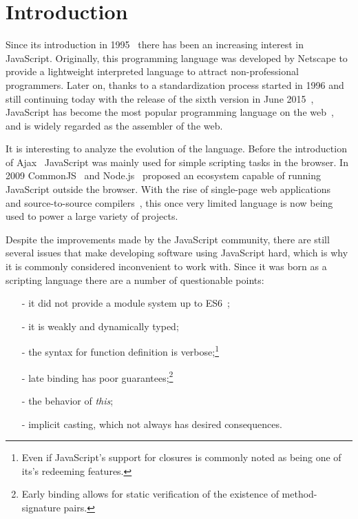 \documentclass{sig-alternate}
\begin{document}



\section{Introduction}
Since its introduction in 1995~\cite{web:js} there has been an increasing interest in JavaScript. Originally, this programming language was developed by Netscape to provide a lightweight interpreted language to attract non-professional programmers. Later on, thanks to a standardization process started in 1996 and still continuing today with the release of the sixth version in June 2015~\cite{web:ecmascript6}, JavaScript has become the most popular programming language on the web~\cite{redmonk}, and is widely regarded as the assembler of the web.

It is interesting to analyze the evolution of the language. Before the introduction of Ajax~\cite{web:ajax} JavaScript was mainly used for simple scripting tasks in the browser. In 2009 CommonJS~\cite{web:commonjs} and Node.js~\cite{web:nodejs} proposed an ecosystem capable of running JavaScript outside the browser. With the rise of single-page web applications~\cite{web:spa} and source-to-source compilers~\cite{web:compile2js}, this once very limited language is now being used to power a large variety of projects.

Despite the improvements made by the JavaScript community, there are still several issues that make developing software using JavaScript hard, which is why it is commonly considered inconvenient to work with. Since it was born as a scripting language there are a number of questionable points:

\begin{itemize}
	\item[-] it did not provide a module system up to ES6~\cite{web:es6modules};
	\item[-] it is weakly and dynamically typed;
	\item[-] the syntax for function definition is verbose;\footnote{Even if JavaScript's support for closures is commonly noted as being one of its\rq{s} redeeming features.}
	\item[-] late binding has poor guarantees;\footnote{Early binding allows for static verification of the existence of method-signature pairs.}
	\item[-] the behavior of \emph{this};
	\item[-] implicit casting, which not always has desired consequences.
\end{itemize}
\end{document}
